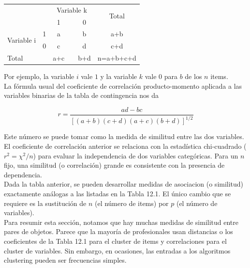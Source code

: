\documentclass[a4paper, 20pt]{article}
\begin{document}
\begin{table}[h]
\centering
\resizebox{7.5cm}{!} {
\begin{tabular}{ll|clc|c|l}
\multicolumn{2}{l|}{\multirow{2}{*}{}} & \multicolumn{3}{c}{Variable k} & \multicolumn{2}{c|}{\multirow{2}{*}{Total}} \\
\multicolumn{2}{l|}{}                  & 1        &       & 0       & \multicolumn{2}{c|}{}                        \\ \hline
\multirow{2}{*}{Variable i}       & 1      & a        &       & b       & \multicolumn{2}{c|}{a+b}                     \\
                              & 0      & c        &       & d       & \multicolumn{2}{c|}{c+d}                     \\ \hline
\multicolumn{2}{l|}{Total}            & a+c      &       & b+d     & \multicolumn{2}{c|}{n=a+b+c+d}              
\end{tabular}
}
\end{table}

Por ejemplo, la variable $i$ vale $1$ y la variable $k$ vale $0$ para $b$ de los $n$ items.\\
La fórmula usual del coeficiente de correlación producto-momento aplicada a las variables binarias de la tabla de contingencia nos da

$$r = \frac{ad-bc}{[(a+b)(c+d)(a+c)(b+d)]^{1/2}}$$

Este número se puede tomar como la medida de similitud entre las dos variables.\\
El coeficiente de correlación anterior se relaciona con la estadística chi-cuadrado ($r^2=\chi^2/n$) para evaluar la independencia de dos variables categóricas. Para un $n$ fijo, una similitud (o correlación) grande es consistente con la presencia de dependencia.\\

Dada la tabla anterior, se pueden desarrollar medidas de asociacion (o similitud) exactamente análogas a las listadas en la Tabla 12.1. El único cambio que se requiere es la sustitución de $n$ (el número de items) por $p$ (el número de variables).\\

Para resumir esta sección, notamos que hay muchas medidas de similitud entre pares de objetos. Parece que la mayoría de profesionales usan distancias o los coeficientes de la Tabla 12.1 para el cluster de items y correlaciones para el cluster de variables. Sin embargo, en ocasiones, las entradas a los algoritmos clustering pueden ser frecuencias simples.\\
\end{document}
